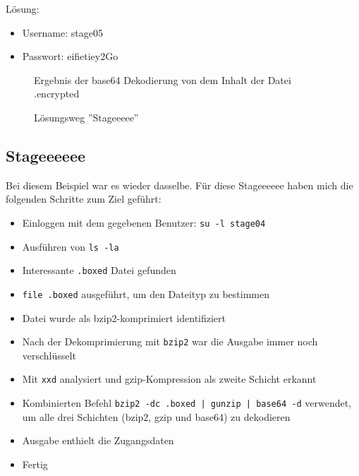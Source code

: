 \documentclass[12pt, a4paper, titlepage, oneside]{scrartcl}
\begin{document}
	Lösung:
	\begin{itemize}
		\item Username: stage05

		\item Passwort: eifietiey2Go
	\end{itemize}

	\begin{figure}[h!]
		\centering
		\caption{Ergebnis der base64 Dekodierung von dem Inhalt der Datei .encrypted}
		\label{fig:stageeeee_base64_output}
	\end{figure}

	\begin{figure}[h!]
		\centering
		\caption{Lösungsweg ''Stageeeee''}
		\label{fig:stageeeee_solution}
	\end{figure}

	\newpage

	\subsection{Stageeeeee}
	Bei diesem Beispiel war es wieder dasselbe. Für diese Stageeeeee haben mich
	die folgenden Schritte zum Ziel geführt:

	\begin{itemize}
		\item Einloggen mit dem gegebenen Benutzer: \lstinline{su -l stage04}

		\item Ausführen von \lstinline{ls -la}

		\item Interessante \lstinline{.boxed} Datei gefunden

		\item \lstinline{file .boxed} ausgeführt, um den Dateityp zu bestimmen

		\item Datei wurde als bzip2-komprimiert identifiziert

		\item Nach der Dekomprimierung mit \lstinline{bzip2} war die Ausgabe immer
			noch verschlüsselt

		\item Mit \lstinline{xxd} analysiert und gzip-Kompression als zweite Schicht
			erkannt

		\item Kombinierten Befehl \lstinline{bzip2 -dc .boxed | gunzip | base64 -d}
			verwendet, um alle drei Schichten (bzip2, gzip und base64) zu dekodieren

		\item Ausgabe enthielt die Zugangsdaten

		\item Fertig
	\end{itemize}
\end{document}
